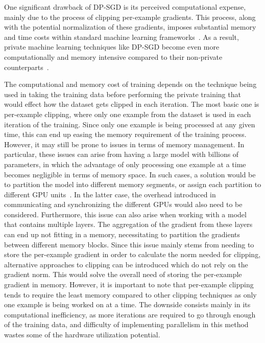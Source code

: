 One significant drawback of DP-SGD is its perceived computational expense, mainly due to the process of clipping per-example gradients. This process, along with the potential normalization of these gradients, imposes substantial memory and time costs within standard machine learning frameworks~\cite{RefWorks:RefID:56-paszke2019pytorch:}. As a result, private machine learning techniques like DP-SGD become even more computationally and memory intensive compared to their non-private counterparts~\cite{RefWorks:RefID:43-dupuy2022efficient}.

The computational and memory cost of training depends on the technique being used in taking the training data before performing the private training that would effect how the dataset gets clipped in each iteration. The most basic one is per-example clipping, where only one example from the dataset is used in each iteration of the training. Since only one example is being processed at any given time, this can end up easing the memory requirement of the training process. However, it may still be prone to issues in terms of memory management. In particular, these issues can arise from having a large model with billions of parameters, in which the advantage of only processing one example at a time becomes negligible in terms of memory space. In such cases, a solution would be to partition the model into different memory segments, or assign each partition to different GPU units~\cite{RefWorks:RefID:60-lv2023full}. In the latter case, the overhead introduced in communicating and synchronizing the different GPUs would also need to be considered. Furthermore, this issue can also arise when working with a model that contains multiple layers. The aggregation of the gradient from these layers can end up not fitting in a memory, necessitating to partition the gradients between different memory blocks. Since this issue mainly stems from needing to store the per-example gradient in order to calculate the norm needed for clipping, alternative approaches to clipping can be introduced which do not rely on the gradient norm. This would solve the overall need of storing the per-example gradient in memory. However, it is important to note that per-example clipping tends to require the least memory compared to other clipping techniques as only one example is being worked on at a time. The downside consists mainly in its computational inefficiency, as more iterations are required to go through enough of the training data, and difficulty of implementing parallelism in this method wastes some of the hardware utilization potential.

